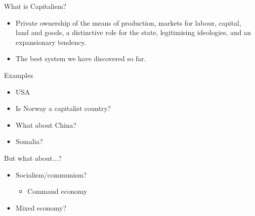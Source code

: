 \documentclass{beamer}
\begin{document}
\begin{frame}{What is Capitalism?}
\begin{itemize}[<+- | alert@+>]
    \item Private ownership of the means of production, markets for labour, capital, land and goods, a distinctive role for the state, legitimising ideologies, and an expansionary tendency.
    \item The best system we have discovered so far.
\end{itemize}{}
\end{frame}{}

\begin{frame}{Examples}
\begin{itemize}[<+- | alert@+>]
    \item USA
    \item Is Norway a capitalist country?
    \item What about China?
    \item Somalia?
\end{itemize}
\end{frame}{}

\begin{frame}{But what about...?}
\begin{itemize}[<+- | alert@+>]

\item Socialism/communism?
	\begin{itemize}[<+- | alert@+>]
		\item Command economy
	\end{itemize}
\item Mixed economy? 

\end{itemize}		
\end{frame}
\end{document}
